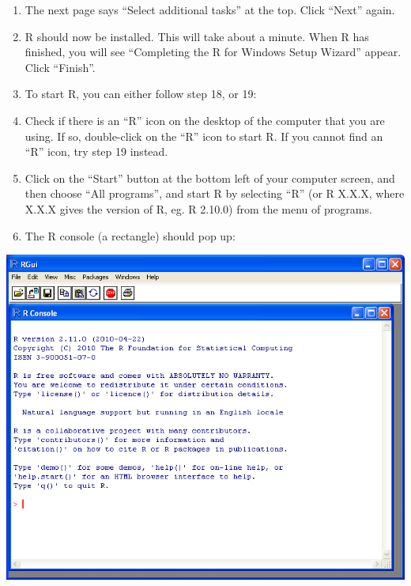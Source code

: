 \documentclass[a4paper,10pt,english]{sphinxmanual}
\begin{document}
\begin{enumerate}
\item {} 
The next page says ``Select additional tasks'' at the top. Click ``Next'' again.

\item {} 
R should now be installed. This will take about a minute. When R has finished, you will
see ``Completing the R for Windows Setup Wizard'' appear. Click ``Finish''.

\item {} 
To start R, you can either follow step 18, or 19:

\item {} 
Check if there is an ``R'' icon on the desktop of the computer that you are using.
If so, double-click on the ``R'' icon to start R. If you cannot find an ``R'' icon, try step 19 instead.

\item {} 
Click on the ``Start'' button at the bottom left of your computer screen, and then
choose ``All programs'', and start R by selecting ``R''  (or R X.X.X, where
X.X.X gives the version of R, eg. R 2.10.0) from the menu of programs.

\item {} 
The R console (a rectangle) should pop up:

\end{enumerate}

\includegraphics{image3.png}
\end{document}
